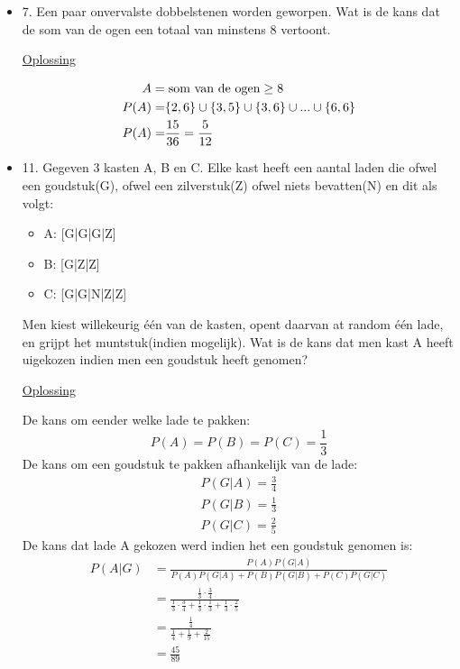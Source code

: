 \documentclass[12pt]{report}
\newcommand{\exercise}[2]{
  #1
  

  \underline{Oplossing}
  
  #2
  
    \hrulefill
}
\begin{document}
\begin{itemize}[label={}, leftmargin=*]
	      
	      
	\item{\exercise{7. Een paar onvervalste dobbelstenen worden geworpen. Wat is de kans dat de som van de ogen een totaal van minstens 8 vertoont.}{
	      \begin{equation*}
	      	\begin{split}
	      		A =  &\;\hbox{som van de ogen} \geq 8\\
	      		P(A) =  &\{2, 6\} \cup \{3, 5\} \cup \{3, 6\} \cup ... \cup \{6,6\} \\
	      		P(A) = & \frac{15}{36} = \frac{5}{12}
	      	\end{split}
	      \end{equation*}}}
	      
	\item{\exercise{11. Gegeven 3 kasten A, B en C. Elke kast heeft een aantal laden die ofwel een goudstuk(G), ofwel een zilverstuk(Z) ofwel niets bevatten(N) en dit als volgt:
	\begin{itemize}[label={}]
	 \item A: [G|G|G|Z]
	 \item B: [G|Z|Z]
	 \item C: [G|G|N|Z|Z]
	\end{itemize}
	Men kiest willekeurig één van de kasten, opent daarvan at random één lade, en grijpt het muntstuk(indien mogelijk). Wat is de kans dat men kast A heeft uigekozen indien men een goudstuk heeft genomen?
	}{
	De kans om eender welke lade te pakken:
	$$P(A) = P(B) = P(C) = \frac{1}{3}$$
	De kans om een goudstuk te pakken afhankelijk van de lade:
	\begin{gather*}
	 P(G|A) = \frac{3}{4}\\
	 P(G|B) = \frac{1}{3}\\
	 P(G|C) = \frac{2}{5}
	\end{gather*}
	De kans dat lade A gekozen werd indien het een goudstuk genomen is:
	\begin{equation*}
	 \begin{split}
	  P(A|G) & = \frac{P(A)P(G|A)}{P(A)P(G|A)+P(B)P(G|B)+P(C)P(G|C)} \\
	         & = \frac{\frac{1}{3}\cdot\frac{3}{4}}{\frac{1}{3}\cdot\frac{3}{4}+\frac{1}{3}\cdot\frac{1}{3}+\frac{1}{3}\cdot\frac{2}{5}} \\
	         & = \frac{\frac{1}{4}}{\frac{1}{4} + \frac{1}{9} + \frac{2}{15}} \\
	         & = \frac{45}{89}
	 \end{split}
	\end{equation*}

}}
\end{itemize}
\end{document}
